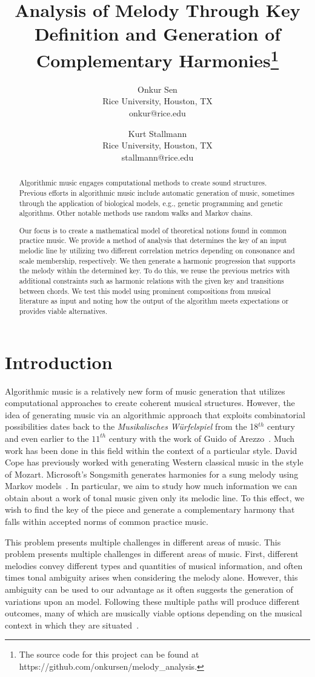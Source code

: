\documentclass[11pt]{article}
\title{Analysis of Melody Through Key Definition and Generation of Complementary Harmonies\footnote{The source code for this project can be found at https://github.com/onkursen/melody_analysis.}}
\author{
Onkur Sen\\
Rice University, Houston, TX\\
onkur@rice.edu\\
\and
Kurt Stallmann\\
Rice University, Houston, TX\\
stallmann@rice.edu
}
\date{}
\begin{document}
\maketitle

\begin{abstract}
	Algorithmic music engages computational methods to create sound structures. Previous efforts in algorithmic music include automatic generation of music, sometimes through the application of biological models, e.g., genetic programming and genetic algorithms. Other notable methods use random walks and Markov chains. 

	Our focus is to create a mathematical model of theoretical notions found in common practice music. We provide a method of analysis that determines the key of an input melodic line by utilizing two different correlation metrics depending on consonance and scale membership, respectively. We then generate a harmonic progression that supports the melody within the determined key. To do this, we reuse the previous metrics with additional constraints such as harmonic relations with the given key and transitions between chords. We test this model using prominent compositions from musical literature as input and noting how the output of the algorithm meets expectations or provides viable alternatives.
\end{abstract}
%
\section{Introduction}
Algorithmic music is a relatively new form of music generation that utilizes computational approaches to create coherent musical structures. However, the idea of generating music via an algorithmic approach that exploits combinatorial possibilities dates back to the {\it Musikalisches W\"{u}rfelspiel} from the 18$^{th}$ century~\cite{cope-EMI} and even earlier to the $11^{th}$ century with the work of Guido of Arezzo~\cite{nierhaus09}. Much work has been done in this field within the context of a particular style.  David Cope has previously worked with generating Western classical music in the style of Mozart. Microsoft's Songsmith generates harmonies for a sung melody using Markov models~\cite{mysong}. In particular, we aim to study how much information we can obtain about a work of tonal music given only its melodic line. To this effect, we wish to find the key of the piece and generate a complementary harmony that falls within accepted norms of common practice music.

This problem presents multiple challenges in different areas of music. This problem presents multiple challenges in different areas of music. First, different melodies convey different types and  quantities of musical information, and often times tonal ambiguity arises when considering the melody alone. However, this ambiguity can be used to our advantage as it often suggests the generation of variations upon an model. Following these multiple paths will produce different outcomes, many of which are musically viable options depending on the musical context in which they  are situated~\cite{schoenberg}.
\end{document}
